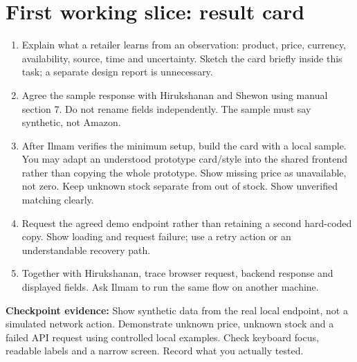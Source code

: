 \section*{First working slice: result card}
\begin{enumerate}
\item Explain what a retailer learns from an observation: product, price, currency, availability, source, time and uncertainty. Sketch the card briefly inside this task; a separate design report is unnecessary.
\item Agree the sample response with Hirukshanan and Shewon using manual section 7. Do not rename fields independently. The sample must say synthetic, not Amazon.
\item After Ilmam verifies the minimum setup, build the card with a local sample. You may adapt an understood prototype card/style into the shared frontend rather than copying the whole prototype. Show missing price as unavailable, not zero. Keep unknown stock separate from out of stock. Show unverified matching clearly.
\item Request the agreed demo endpoint rather than retaining a second hard-coded copy. Show loading and request failure; use a retry action or an understandable recovery path.
\item Together with Hirukshanan, trace browser request, backend response and displayed fields. Ask Ilmam to run the same flow on another machine.
\end{enumerate}
\textbf{Checkpoint evidence:} Show synthetic data from the real local endpoint, not a simulated network action. Demonstrate unknown price, unknown stock and a failed API request using controlled local examples. Check keyboard focus, readable labels and a narrow screen. Record what you actually tested.
